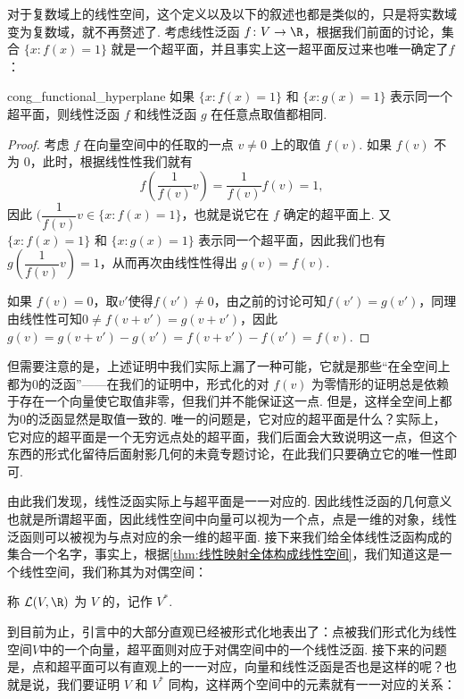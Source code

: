 对于复数域上的线性空间，这个定义以及以下的叙述也都是类似的，只是将实数域变为复数域，就不再赘述了. 考虑线性泛函 $f\colon V \to \R$，根据我们前面的讨论，集合 $\{x: f(x) = 1\}$ 就是一个超平面，并且事实上这一超平面反过来也唯一确定了$f$：

\begin{lemma}{}{cong_functional_hyperplane}
    如果 $\{x: f(x) = 1\}$ 和 $\{x: g(x) = 1\}$ 表示同一个超平面，则线性泛函 $f$ 和线性泛函 $g$ 在任意点取值都相同.
\end{lemma}

\begin{proof}
    考虑 $f$ 在向量空间中的任取的一点 $v \neq 0$ 上的取值 $f(v)$. 如果 $f(v)$ 不为 $0$，此时，根据线性性我们就有
    \[f(\dfrac{1}{f(v)}v)=\dfrac{1}{f(v)}f(v)=1,\]
    因此 $(\dfrac{1}{f(v)}v \in \{x: f(x) = 1\}$，也就是说它在 $f$ 确定的超平面上. 又$\{x: f(x) = 1\}$ 和 $\{x: g(x) = 1\}$ 表示同一个超平面，因此我们也有 $g(\dfrac{1}{f(v)} v) = 1$，从而再次由线性性得出 $g(v) = f(v)$.

    如果 $f(v)=0$，取$v'$使得$f(v')\neq 0$，由之前的讨论可知$f(v')=g(v')$，同理由线性性可知$0\neq f(v+v')=g(v+v')$，因此$g(v)=g(v+v')-g(v')=f(v+v')-f(v')=f(v)$.
\end{proof}

但需要注意的是，上述证明中我们实际上漏了一种可能，它就是那些``在全空间上都为$0$的泛函''——在我们的证明中，形式化的对 $f(v)$ 为零情形的证明总是依赖于存在一个向量使它取值非零，但我们并不能保证这一点. 但是，这样全空间上都为$0$的泛函显然是取值一致的. 唯一的问题是，它对应的超平面是什么？实际上，它对应的超平面是一个无穷远点处的超平面，我们后面会大致说明这一点，但这个东西的形式化留待后面射影几何的未竟专题讨论，在此我们只要确立它的唯一性即可.

由此我们发现，线性泛函实际上与超平面是一一对应的. 因此线性泛函的几何意义也就是所谓超平面，因此线性空间中向量可以视为一个点，点是一维的对象，线性泛函则可以被视为与点对应的余一维的超平面. 接下来我们给全体线性泛函构成的集合一个名字，事实上，根据\autoref{thm:线性映射全体构成线性空间}，我们知道这是一个线性空间，我们称其为对偶空间：
\begin{definition}{}{}
    称 $\mathcal{L}(V, \R)$ 为 $V$ 的，记作 $V^*$.
\end{definition}

到目前为止，引言中的大部分直观已经被形式化地表出了：点被我们形式化为线性空间$V$中的一个向量，超平面则对应于对偶空间中的一个线性泛函. 接下来的问题是，点和超平面可以有直观上的一一对应，向量和线性泛函是否也是这样的呢？也就是说，我们要证明 $V$ 和 $V^*$ 同构，这样两个空间中的元素就有一一对应的关系：

